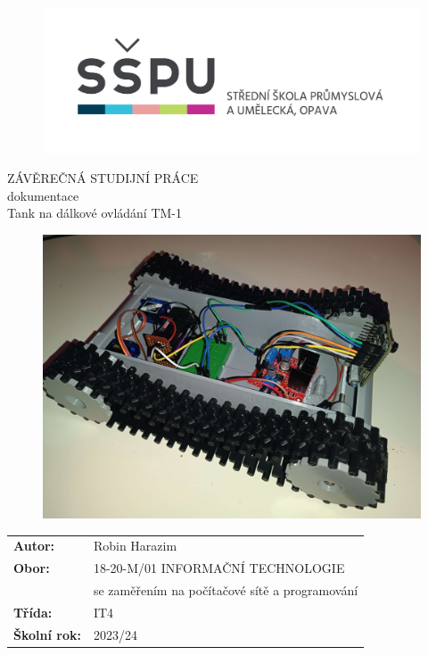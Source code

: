 \documentclass[12pt, a4paper,
oneside
openany
]{report}
\title{\nazevPrace} %
\author{\jmenoAutora} %
\date{\datumOdevzdani} %
\newcommand\obor{INFORMAČNÍ TECHNOLOGIE} %
\newcommand\kodOboru{18-20-M/01} %
\newcommand\zamereni{se zaměřením na počítačové sítě a programování} %
\newcommand\trida{IT4} %
\newcommand\jmenoAutora{Robin Harazim}  %
\newcommand\skolniRok{2023/24} %
\newcommand\nazevPrace{Tank na dálkové ovládání TM-1} %
\begin{document}
	
    \setcounter{page}{1}
    \pagestyle{empty}

	
	{\selectfont
		\begin{figure}[h]
			\centering
			\includegraphics[width=0.6\linewidth]{image/logo-skoly.png} 
		\end{figure}
		
		
		{\bfseries %
			\begin{center}
				\vspace{0.025 \textheight}
				\LARGE{ZÁVĚREČNÁ STUDIJNÍ PRÁCE}\\
				\large{dokumentace}\\
				\vspace{0.075 \textheight}
				\LARGE {\nazevPrace}\\
			\end{center}  
		}%
		
		\begin{figure}[ht]
			\centering
			\includegraphics[width=0.65\linewidth]{image/tank.jpg} 
		\end{figure}
		
		\vspace{0.02 \textheight}
		\begin{table}[h!]
			\begin{tabular}{ll}
				\textbf{Autor:} & \jmenoAutora\\ 
				\textbf{Obor:} & \kodOboru { } \obor\\
				\textbf{} & \zamereni\\
				\textbf{Třída:} & \trida\\
				\textbf{Školní rok:} & \skolniRok\\
			\end{tabular}
			
		\end{table}		
	}
	
\end{document}
